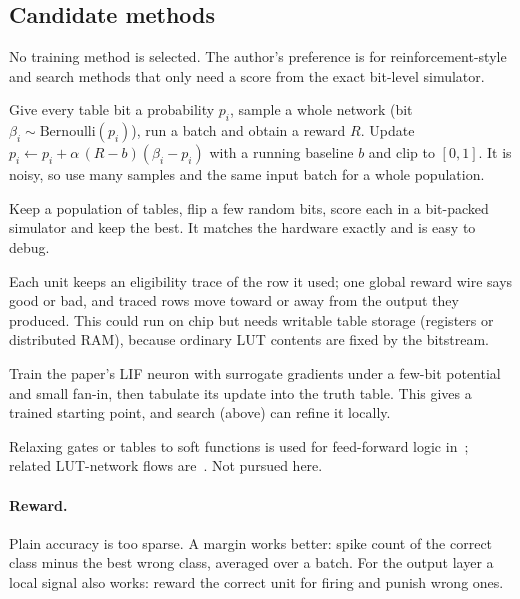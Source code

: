 \subsection{Candidate methods}
No training method is selected. The author's preference is for reinforcement-style and search methods that only need a score from the exact bit-level simulator.
\begin{description}[leftmargin=1.5em,style=nextline]
\item[Policy gradient (REINFORCE).] Give every table bit a probability $p_i$, sample a whole network (bit $\beta_i\sim\mathrm{Bernoulli}(p_i)$), run a batch and obtain a reward $R$. Update $p_i \leftarrow p_i + \alpha\,(R-b)(\beta_i-p_i)$ with a running baseline $b$ and clip to $[0,1]$. It is noisy, so use many samples and the same input batch for a whole population.
\item[Evolutionary search.] Keep a population of tables, flip a few random bits, score each in a bit-packed simulator and keep the best. It matches the hardware exactly and is easy to debug.
\item[Reward-modulated local rule.] Each unit keeps an eligibility trace of the row it used; one global reward wire says good or bad, and traced rows move toward or away from the output they produced. This could run on chip but needs writable table storage (registers or distributed RAM), because ordinary LUT contents are fixed by the bitstream.
\item[Enumeration of a trained few-bit neuron.] Train the paper's LIF neuron with surrogate gradients under a few-bit potential and small fan-in, then tabulate its update into the truth table. This gives a trained starting point, and search (above) can refine it locally.
\item[Differentiable approximations (set aside).] Relaxing gates or tables to soft functions is used for feed-forward logic in~\cite{petersen2022,bacellar2024}; related LUT-network flows are~\cite{umuroglu2020,andronic2024}. Not pursued here. 
\end{description}

\paragraph{Reward.} Plain accuracy is too sparse. A margin works better: spike count of the correct class minus the best wrong class, averaged over a batch. For the output layer a local signal also works: reward the correct unit for firing and punish wrong ones.

